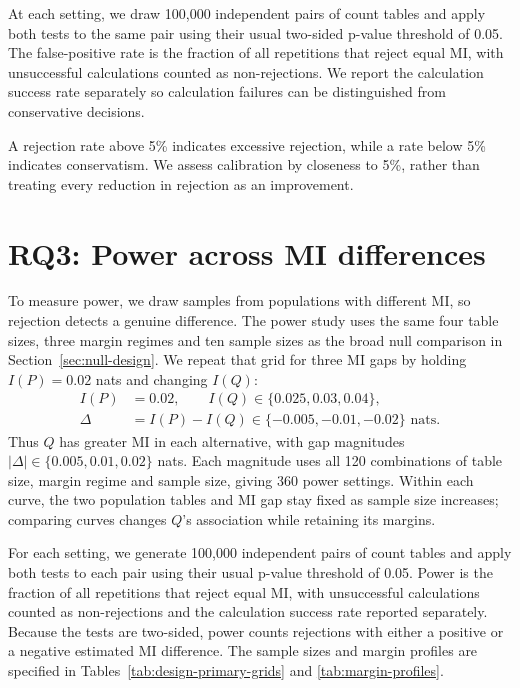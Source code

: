 At each setting, we draw 100,000 independent pairs of count tables and
apply both tests to the same pair using their usual two-sided p-value
threshold of 0.05. The false-positive rate is the fraction of all
repetitions that reject equal MI, with unsuccessful calculations counted as
non-rejections. We report the calculation success rate separately so
calculation failures can be distinguished from conservative decisions.

A rejection rate above 5\% indicates excessive rejection, while a rate
below 5\% indicates conservatism. We assess calibration by closeness to
5\%, rather than treating every reduction in rejection as an improvement.

\section{RQ3: Power across MI differences}
\label{sec:mi-gap-power-design}

To measure power, we draw samples from populations with different MI, so
rejection detects a genuine difference. The power study uses the same
four table sizes, three margin regimes and ten sample sizes as the broad
null comparison in Section~\ref{sec:null-design}. We repeat that grid for
three MI gaps by holding \(I(P)=0.02\) nats and changing \(I(Q)\):
\begin{equation}
\begin{aligned}
 I(P)&=0.02,\qquad I(Q)\in\{0.025,0.03,0.04\},\\
 \Delta&=I(P)-I(Q)\in\{-0.005,-0.01,-0.02\}\text{ nats}.
\end{aligned}
 \label{eq:design-mi-gap-populations}
\end{equation}
Thus \(Q\) has greater MI in each alternative, with gap magnitudes
\(|\Delta|\in\{0.005,0.01,0.02\}\) nats. Each magnitude uses all
120 combinations of table size, margin regime and sample size, giving
360 power settings. Within each curve, the two population tables and
MI gap stay fixed as sample size increases; comparing curves changes
\(Q\)'s association while retaining its margins.

For each setting, we generate 100,000 independent pairs of count tables
and apply both tests to each pair using their usual p-value threshold of
0.05. Power is the fraction of all repetitions that reject equal MI,
with unsuccessful calculations counted as non-rejections and the calculation
success rate reported separately. Because the tests are two-sided, power counts
rejections with either a positive or a negative estimated MI difference.
The sample sizes and margin profiles
are specified in Tables~\ref{tab:design-primary-grids} and
\ref{tab:margin-profiles}.

